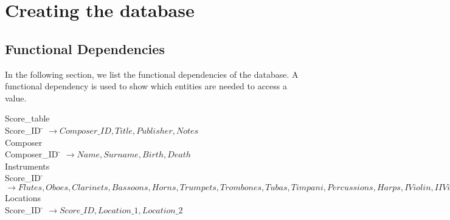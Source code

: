 \documentclass{article}
\begin{document}
\section{Creating the database}

\subsection{Functional Dependencies}
In the following section, we list the functional dependencies of the database. A 
functional dependency is used to show which entities are needed to access a value. 
\\
\begin{tabbing} 
Score\_table\\
Score\_ID \= 	$\longrightarrow{Composer\_ID,Title,Publisher,Notes}$
\\
Composer\\
Composer\_ID \=	$\longrightarrow{Name, Surname, Birth, Death}$
\\
Instruments\\
Score\_ID \=	$\longrightarrow{Flutes, Oboes, Clarinets, Bassoons, Horns, Trumpets, Trombones, Tubas, Timpani, Percussions, Harps, I Violin, II Violin, Violas, Celli, Basses}$
\\
Locations\\
Score\_ID \=	$\longrightarrow{{Score\_ID, Location\_1, Location\_2}}$
\end{tabbing}
\end{document}
